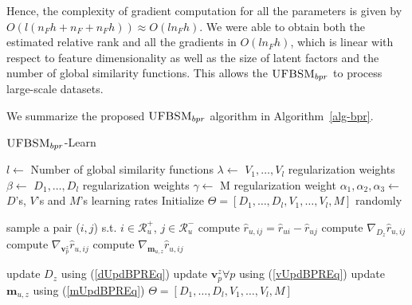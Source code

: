 Hence, the complexity of gradient
computation for all the parameters is given by $O(l(n_F h + n_F + n_F h))
\approx O(l n_F h)$. We were able to obtain both the estimated relative rank
and all the gradients in $O(l n_F h)$, which is linear with respect to
feature dimensionality as well as the size of latent factors and the number of
global similarity functions. This allows the $\textsc{UFBSM}_{bpr}$ to process large-scale datasets.

We summarize the proposed $\textsc{UFBSM}_{bpr}$ algorithm in
Algorithm~\ref{alg-bpr}.
\begin{algorithm}[t]
\caption{$\textsc{UFBSM}_{bpr}$-Learn}
\label{alg-bpr}
\begin{algorithmic}[1]
    \State $l \gets$ Number of global similarity functions
    \State $\lambda \gets$ $V_1,\ldots,V_l$ regularization weights
    \State $\beta \gets$ $D_1,\ldots,D_l$ regularization weights
    \State $\gamma \gets$ M regularization weight
    \State $\alpha_1, \alpha_2, \alpha_3 \gets$ $D$'s, $V$'s and $M$'s learning rates
    \State Initialize $\Theta=[D_1,\ldots,D_l,V_1,\ldots,V_l,M]$ randomly 
    
    \State
    
        \State sample a pair ($i,j$) s.t.  $i \in \mathcal{R}_u^+$, $j \in \mathcal{R}_u^-$
        \State compute $\hat{r}_{u,ij} = \hat{r}_{ui} - \hat{r}_{uj}$
        \State compute $\nabla_{D_z} \hat{r}_{u,ij} $ 
        \State compute $\nabla_{\bm{v}_{p}^z} \hat{r}_{u,ij} $ 
        \State compute $\nabla_{\bm{m}_{u,z}} \hat{r}_{u,ij} $ 
        
        \State update $D_z$ using (\ref{dUpdBPREq})
        \State update $\bm{v}_p^z \forall p$  using (\ref{vUpdBPREq})
        \State update $\bm{m}_{u,z}$ using (\ref{mUpdBPREq})
      \EndFor
    \EndWhile
    \State
    \State \Return $\Theta=[D_1,\ldots,D_l,V_1,\ldots,V_l,M]$
  \EndProcedure
\end{algorithmic}
\end{algorithm} 




